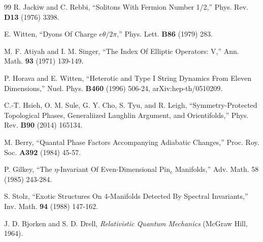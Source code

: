 \begin{thebibliography}{99}
R. Jackiw and C. Rebbi, ``Solitons  With Fermion Number 1/2,'' Phys. Rev. {\bf D13} (1976) 3398.

E. Witten, ``Dyons Of Charge $e\theta/2\pi$,'' Phys. Lett. {\bf B86} (1979) 283.



M. F. Atiyah and I. M. Singer, ``The Index Of Elliptic Operators: V,''  Ann. Math. {\bf 93} (1971) 139-149.

P. Horava and E. Witten, ``Heterotic and Type I String Dynamics From Eleven Dimensions,'' Nuel. Phys. {\bf B460} (1996) 506-24, arXiv:hep-th/0510209.

C.-T. Hsieh, O. M. Sule, G. Y. Cho, S. Tyu, and R. Leigh, ``Symmetry-Protected Topological Phases, Generaliized Laughlin Argument, and Orientifolds,'' 
Phys. Rev. {\bf B90} (2014) 165134.

M. Berry, ``Quantal Phase Factors Accompanying Adiabatic Changes,'' Proc. Roy. Soc. {\bf A392} (1984) 45-57.

P. Gilkey, ``The $\eta$-Invariant Of Even-Dimensional $\mathrm{Pin}_c$ Manifolds,'' Adv. Math. 58 (1985) 243-284.

S. Stolz, ``Exotic Structures On 4-Manifolds Detected By
Spectral Invariants,'' Inv. Math. {\bf 94} (1988) 147-162.


J. D. Bjorken and S. D. Drell, {\it Relativistic Quantum Mechanics} (McGraw Hill, 1964).



\end{thebibliography}

